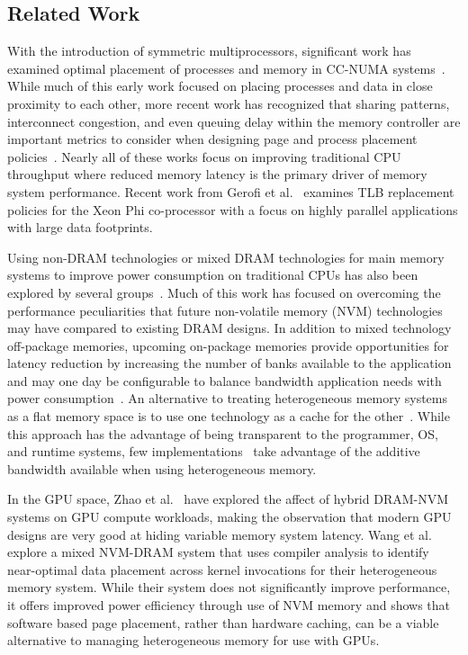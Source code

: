 \subsection{Related Work}
\label{related_work}
With the introduction of symmetric multiprocessors, significant work has examined optimal placement of processes and memory
in CC-NUMA systems~\cite{Wilson2001,Bolosky1989,Brecht1993,LaRowe1992,Verghese1996,Iyer1998}.
While much of this early work focused on placing processes and data in
close proximity to each other,  more recent work has recognized that
sharing patterns, interconnect congestion, and even queuing
delay within the memory controller are important metrics to consider when
designing page and process placement policies~\cite{AUTONUMA,Dashti2013,Tam2007,Zhuravlev2010,Knauerhase2008,Blagodurov2011,awasthinellans10}.
Nearly all of these works focus on improving traditional CPU throughput
where reduced memory latency is the primary driver of memory system performance.
Recent work from Gerofi et al.~\cite{Gerofi2014} examines TLB replacement policies for the Xeon Phi
co-processor with a focus on highly parallel applications with large data
footprints.

Using non-DRAM technologies or mixed DRAM technologies for main memory systems to improve power
consumption on traditional CPUs has also been
explored by several groups~\cite{Kultursay2013,Phadke11mlpaware2011,Mogul2009,Bheda2011,Ramos2011,Nil2012,pavlovic2013}.  
Much of this work has focused on overcoming the performance
peculiarities that future non-volatile memory (NVM) technologies may have compared to existing DRAM designs.
In addition to mixed technology off-package memories, upcoming on-package memories provide opportunities
for latency reduction by increasing the number of banks available to the application~\cite{Dong2010}
and may one day be configurable to balance bandwidth application needs with power
consumption~\cite{Zhao2012}.
An alternative to treating heterogeneous memory systems as a flat
memory space is to use one technology as a cache for the other~\cite{jiang2011,Meza2012}.  While this
approach has the advantage of being transparent to the programmer, 
{\color{black}OS, and runtime systems}, 
few implementations~\cite{Sim2012} take advantage of the additive bandwidth available
when using heterogeneous memory.

In the GPU space, Zhao et al.~\cite{zhao2013} have explored the affect 
of hybrid DRAM-NVM systems on GPU compute workloads, making the observation that modern GPU designs are very
good at hiding variable memory system latency. Wang et al.~\cite{Wang2013} explore a mixed NVM-DRAM
system that uses compiler analysis to identify near-optimal data placement across kernel invocations
for their heterogeneous memory system. While their system 
does not significantly improve performance, it offers improved power 
efficiency through use of NVM memory and shows that software based page 
placement, rather than hardware caching, can be a viable 
alternative to managing heterogeneous memory for use with GPUs.
